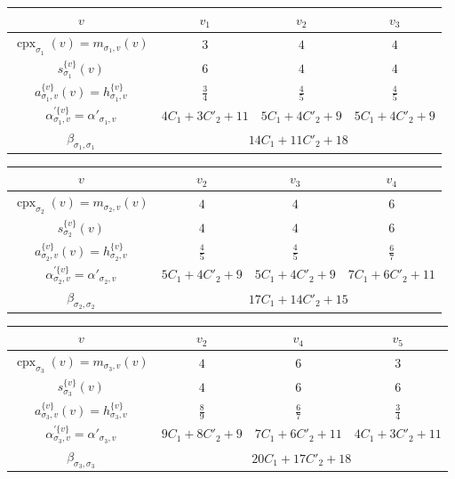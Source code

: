 \documentclass[11pt]{article}
\theoremstyle{definition}
\numberwithin{equation}{section}
\begin{document}
\begin{table}[ht]
  \centering

{\renewcommand\arraystretch{1.3}
\begin{tabular}{c||ccc}
    \hline
    $v$ & $v_1$ & $v_2$ & $v_3$ \\ 
    \hline \hline
    $\operatorname{cpx}_{\sigma _1} (v) = m_{\sigma _1, v} (v)$ & $3$ & $4$ & $4$ \\
   	$s_{\sigma _1} ^{\{ v \}}(v)$ & $6$ & $4$ & $4$ \\
	$a_{\sigma _1 , v}^{\{ v \}} (v) = h_{\sigma _1, v}^{\{ v \}}$ & $\frac{3}{4}$ & $\frac{4}{5}$ & $\frac{4}{5}$ \\
	$\alpha^{\prime \{ v \}} _{\sigma _1, v} = \alpha' _{\sigma _1, v}$ & $4C_1 + 3C'_2 + 11$ & $5C_1 + 4C'_2 + 9$ & $5C_1 + 4C'_2 + 9$ \\
	$\beta _{\sigma _1, \sigma _1}$ & \multicolumn{3}{c}{$14C_1 + 11C'_2 + 18$} \\
    \hline
\end{tabular}
}

\vspace{3mm}

{\renewcommand\arraystretch{1.3}
\begin{tabular}{c||ccc}
    \hline
    $v$ & $v_2$ & $v_3$ & $v_4$ \\ 
    \hline \hline
    $\operatorname{cpx}_{\sigma _2} (v) = m_{\sigma _2, v} (v)$ & $4$ & $4$ & $6$ \\
   	$s_{\sigma _2} ^{\{ v \}}(v)$ & $4$ & $4$ & $6$ \\
	$a_{\sigma _2, v}^{\{ v \}} (v) = h_{\sigma _2, v}^{\{ v \}}$ & $\frac{4}{5}$ & $\frac{4}{5}$ & $\frac{6}{7}$ \\
	$\alpha^{\prime \{ v \}} _{\sigma _2, v} = \alpha' _{\sigma _2, v}$ & $5C_1 + 4C'_2 + 9$ & $5C_1 + 4C'_2 + 9$ & $7C_1 + 6C'_2 + 11$ \\
	$\beta _{\sigma _2, \sigma _2}$ & \multicolumn{3}{c}{$17C_1 + 14C'_2 + 15$} \\
    \hline
\end{tabular}
}

\vspace{3mm}

{\renewcommand\arraystretch{1.3}
\begin{tabular}{c||ccc}
    \hline
    $v$ & $v_2$ & $v_4$ & $v_5$ \\ 
    \hline \hline
    $\operatorname{cpx}_{\sigma _3} (v) = m_{\sigma _3, v} (v)$ & $4$ & $6$ & $3$ \\
   	$s_{\sigma _3} ^{\{ v \}}(v)$ & $4$ & $6$ & $6$ \\
	$a_{\sigma _3, v}^{\{ v \}} (v) = h_{\sigma _3, v}^{\{ v \}}$ & $\frac{8}{9}$ & $\frac{6}{7}$ & $\frac{3}{4}$ \\
	$\alpha^{\prime \{ v \}} _{\sigma _3, v} = \alpha' _{\sigma _3, v}$ & $9C_1 + 8C'_2 + 9$ & $7C_1 + 6C'_2 + 11$ & $4C_1 + 3C'_2 + 11$ \\
	$\beta _{\sigma _3, \sigma _3}$ & \multicolumn{3}{c}{$20C_1 + 17C'_2 + 18$} \\
    \hline
\end{tabular}
}


\end{table}
\end{document}
